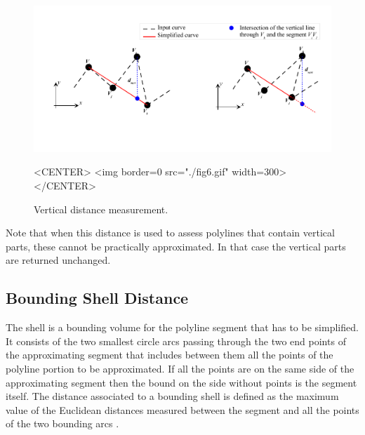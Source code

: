 \begin{figure}[h]
\begin{ccTexOnly}
\begin{center}
\includegraphics[width=15cm]{Polygonal_approximation_d/fig6} 
\end{center}
\end{ccTexOnly}
\caption{Vertical distance measurement.
\label{Simplification_Fig_Vertical}}
\begin{ccHtmlOnly}
<CENTER>
<img border=0 src="./fig6.gif" width=300>
</CENTER>
\end{ccHtmlOnly}
\end{figure}


Note that when this distance is used to assess polylines that contain
vertical parts, these cannot be practically approximated. In that case
the vertical parts are returned unchanged.


\subsection{ Bounding Shell Distance }

The shell is a bounding volume for the polyline segment that has to be
simplified. It consists of the two smallest circle arcs passing
through the two end points of the approximating segment that includes
between them all the points of the polyline portion to be
approximated. If all the points are on the same side of the
approximating segment then the bound on the side without points is the
segment itself. The distance associated to a bounding shell is defined
as the maximum value of the Euclidean distances measured between the
segment and all the points of the two bounding arcs \cite{[cgal:v-hal-94]}.

